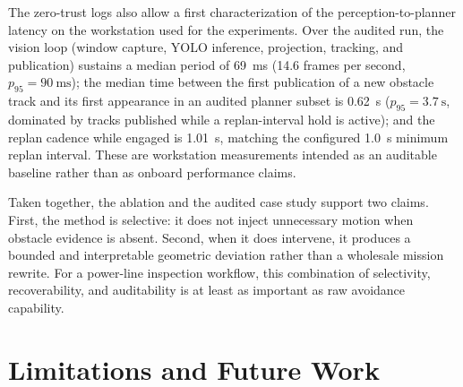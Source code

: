 \documentclass[a4paper,11pt]{article}
\begin{document}
The zero-trust logs also allow a first characterization of the perception-to-planner latency on the workstation used for the experiments. Over the audited run, the vision loop (window capture, YOLO inference, projection, tracking, and publication) sustains a median period of \SI{69}{\milli\second} (14.6 frames per second, $p_{95}=\SI{90}{\milli\second}$); the median time between the first publication of a new obstacle track and its first appearance in an audited planner subset is \SI{0.62}{\second} ($p_{95}=\SI{3.7}{\second}$, dominated by tracks published while a replan-interval hold is active); and the replan cadence while engaged is \SI{1.01}{\second}, matching the configured \SI{1.0}{\second} minimum replan interval. These are workstation measurements intended as an auditable baseline rather than as onboard performance claims.

Taken together, the ablation and the audited case study support two claims. First, the method is selective: it does not inject unnecessary motion when obstacle evidence is absent. Second, when it does intervene, it produces a bounded and interpretable geometric deviation rather than a wholesale mission rewrite. For a power-line inspection workflow, this combination of selectivity, recoverability, and auditability is at least as important as raw avoidance capability.

\section{Limitations and Future Work}
\end{document}
